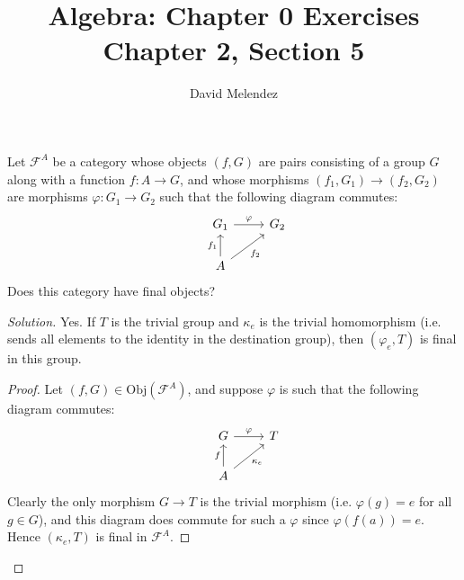 \documentclass[12pt]{article}
\newenvironment{problem}[2][Problem]{\begin{trivlist}
\item[\hskip \labelsep {\bfseries #1}\hskip \labelsep {\bfseries #2.}]}{\end{trivlist}}
\newcommand{\Obj}{\text{Obj}}
\newenvironment{solution}
  {\renewcommand\qedsymbol{$\blacksquare$}\begin{proof}[Solution]}
{\end{proof}}
\newenvironment{sproof}{
  \renewcommand\qedsymbol{$\square$}
  \begin{proof}
  }{
  \end{proof}
}
\begin{document}
\title{Algebra: Chapter 0 Exercises\\ \large Chapter 2, Section 5}
\author{David Melendez}
\maketitle

\begin{problem}{1}
  Let $\mathscr{F}^A$ be a category whose objects $(f, G)$ are pairs consisting of a group $G$ along with
  a function $f : A \to G$, and whose morphisms $(f_1, G_1)\to (f_2, G_2)$ are morphisms 
  $\varphi : G_1 \to G_2$
  such that the following diagram commutes:
  \[\begin{tikzcd}
    & G_1\ar{r}{\varphi} & G_2 \\
    & A \ar{u}{f_1} \ar{ur}[swap]{f_2}
    \end{tikzcd}\]
    Does this category have final objects?
\end{problem}
\begin{solution}
  Yes. If $T$ is the trivial group and $\kappa_e$ is the trivial homomorphism 
  (i.e. sends all elements to the identity in the destination group),
  then $(\varphi_e,T)$ is final in this group. 
  \begin{sproof}
    Let $(f, G)\in \Obj(\mathscr{F}^A)$, and suppose $\varphi$ is such that the following diagram commutes:
   \[\begin{tikzcd}
    & G\ar{r}{\varphi} & T \\
    & A \ar{u}{f} \ar{ur}[swap]{\kappa_e}
    \end{tikzcd}\]
    Clearly the only morphism $G\to T$ is the trivial morphism (i.e. $\varphi(g) = e$ for all $g\in G$),
    and this diagram does commute for such a $\varphi$ since $\varphi(f(a)) = e$.
    Hence $(\kappa_e,T)$ is final in $\mathscr{F}^A$.
  \end{sproof}
\end{solution}
\end{document}
